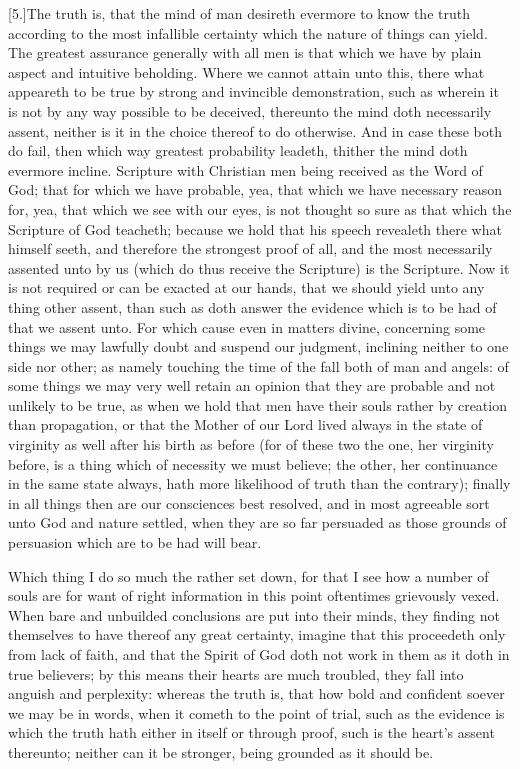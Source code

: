 [5.]The truth is, that the mind of man desireth evermore to know the truth according to the most infallible certainty which the nature of things can yield. The greatest assurance generally with all men is that which we have by plain aspect and intuitive beholding. Where we cannot attain unto this, there what appeareth to be true by strong and invincible demonstration, such as wherein it is not by any way possible to be deceived, thereunto the mind doth necessarily assent, neither is it in the choice thereof to do otherwise. And in case these both do fail, then which way greatest probability leadeth, thither the mind doth evermore incline. Scripture with Christian men being received as the Word of God; that for which we have probable, yea, that which we have necessary reason for, yea, that which we see with our eyes, is not thought so sure as that which the Scripture of God teacheth; because we hold that his speech revealeth there what himself seeth, and therefore the strongest proof of all, and the most necessarily assented unto by us (which do thus receive the Scripture) is  the Scripture. Now it is not required or can be exacted at our hands, that we should yield unto any thing other assent, than such as doth answer the evidence which is to be had of that we assent unto. For which cause even in matters divine, concerning some things we may lawfully doubt and suspend our judgment, inclining neither to one side nor other; as namely touching the time of the fall both of man and angels: of some things we may very well retain an opinion that they are probable and not unlikely to be true, as when we hold that men have their souls rather by creation than propagation, or that the Mother of our Lord lived always in the state of virginity as well after his birth as before (for of these two the one, her virginity before, is a thing which of necessity we must believe; the other, her continuance in the same state always, hath more likelihood of truth than the contrary); finally in all things then are our consciences best resolved, and in most agreeable sort unto God and nature settled, when they are so far persuaded as those grounds of persuasion which are to be had will bear.

Which thing I do so much the rather set down, for that I see how a number of souls are for want of right information in this point oftentimes grievously vexed. When bare and unbuilded conclusions are put into their minds, they finding not themselves to have thereof any great certainty, imagine that this proceedeth only from lack of faith, and that the Spirit of God doth not work in them as it doth in true believers; by this means their hearts are much troubled, they fall into anguish and perplexity: whereas the truth is, that how bold and confident soever we may be in words, when it cometh to the point of trial, such as the evidence is which the truth hath either in itself or through proof, such is the heart’s assent thereunto; neither can it be stronger, being grounded as it should be.

